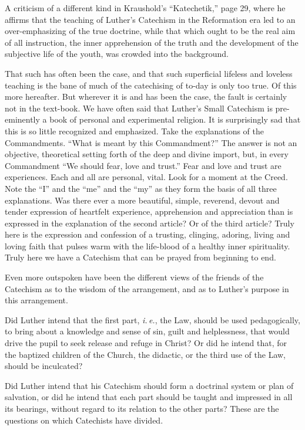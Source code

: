  A criticism of a different kind in Kraushold’s “Katechetik,” page 29, where he affirms that the teaching of Luther’s Catechism in the Reformation era led to an over-emphasizing of the true doctrine, while that which ought to be the real aim of all instruction, the inner apprehension of the truth and the development of the subjective life of the youth, was crowded into the background.

That such has often been the case, and that such superficial lifeless and loveless teaching is the bane of much of the catechising of to-day is only too true. Of this more hereafter. But wherever it is and has been the case, the fault is certainly not in
the text-book. We have often said that Luther’s Small Catechism is pre-eminently a book of personal and experimental religion. It is surprisingly sad that this is so little recognized and emphasized.  Take the explanations of the Commandments. “What is meant by this Commandment?” The answer is not an objective, theoretical setting forth of the deep and divine import, but, in every Commandment “We should fear, love and trust.” Fear and love and trust are experiences. Each and all are personal, vital. Look for a moment at the Creed. Note the “I” and the “me” and the “my” as they form the basis of all three explanations. Was there ever a more beautiful, simple, reverend, devout and tender expression of heartfelt experience, apprehension and appreciation than is expressed in the explanation of the second article? Or of the third article? Truly here is the expression and confession of a trusting, clinging, adoring, living and loving faith that pulses warm with the life-blood of a healthy inner spirituality. Truly here we have a Catechism that can be prayed from beginning to end.

Even more outspoken have been the different views of the friends of the Catechism as to the wisdom of the arrangement, and as to Luther’s purpose in this arrangement.

Did Luther intend that the first part, \emph{i.\,e.}, the
 Law, should be used pedagogically, to bring about a knowledge and sense of sin, guilt and helplessness, that would drive the pupil to seek release and refuge in Christ? Or did he intend that, for the baptized children of the Church, the didactic, or the third use of the Law, should be inculcated?

Did Luther intend that his Catechism should form a doctrinal system or plan of salvation, or did he intend that each part should be taught and impressed in all its bearings, without regard to its relation to the other parts? These are the questions on which Catechists have divided.

